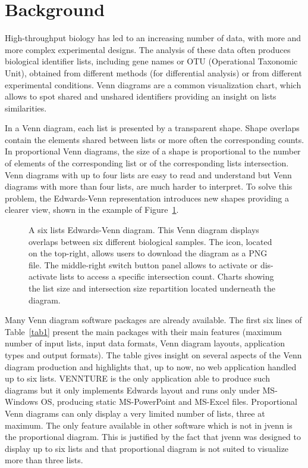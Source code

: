 \documentclass[11pt]{bmc_article_s50}
\begin{document}

\section*{Background}

High-throughput biology has led to an increasing number of data, with more and
more complex experimental designs. The analysis of these data often produces
biological identifier lists, including gene names or OTU (Operational Taxonomic
Unit), obtained from different methods (for differential analysis) or from
different experimental conditions. Venn diagrams \cite{Venn1880} are a common
visualization chart, which allows to spot shared and unshared identifiers
providing an insight on lists similarities.

In a Venn diagram, each list is presented by a transparent shape. Shape overlaps
contain the elements shared between lists or more often the corresponding counts.
In proportional Venn diagrams, the size of a shape is proportional to the
number of elements of the corresponding list or of the corresponding lists
intersection. Venn diagrams with up to four lists are easy to read and
understand but Venn diagrams with more than four lists, are much harder to
interpret. To solve this problem, the Edwards-Venn \cite{Edwards2004}
representation introduces new shapes providing a clearer view, shown in the
example of Figure~\ref{fig2}.

  \begin{figure}[h!]
  \hrulefill
  \vskip-5pt
\caption{A six lists Edwards-Venn diagram.
      This Venn diagram displays overlaps between six different biological
      samples. The icon, located on the top-right, allows users to download the
      diagram as a PNG file. The middle-right switch button
      panel allows to activate or dis-activate lists to access a specific
      intersection count. Charts showing the list size and intersection size
      repartition located underneath the diagram.}\label{fig2}
   \vskip-5pt
\hrulefill
\end{figure}

Many Venn diagram software packages are already available. The first six lines
of Table~\ref{tab1} present the main packages with their
main features (maximum number of input lists, input data formats, Venn diagram
layouts, application types and output formats). The table gives insight on
several aspects of the Venn diagram production and highlights that, up to now,
no web application handled up to six lists. VENNTURE \cite{Bronwen2012} is the
only application able to produce such diagrams but it only implements Edwards
layout and runs only under MS-Windows OS, producing static MS-PowerPoint and
MS-Excel files. Proportional Venn diagrams can only display a very limited
number of lists, three at maximum. The only feature available in other software
which is not in jvenn is the proportional diagram. This is justified by the fact
that jvenn was designed to display up to six lists and that proportional diagram
is not suited to visualize more than three lists.
\end{document}
